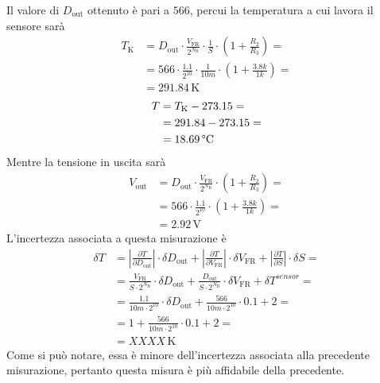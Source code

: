 \documentclass[a4paper]{article}
\newcommand\abs[1]{\left|#1\right|}
\begin{document}
			Il valore di $ D_{\mathrm{out}} $ ottenuto è pari a $ 566 $, percui la temperatura a cui lavora il sensore sarà
			\begin{equation*}
				\begin{split}
					T_{\mathrm{K}} &= D_{\mathrm{out}} \cdot \frac{V_{\mathrm{FR}}}{2^{N_{\mathrm{B}}}} \cdot \frac{1}{S} \cdot (1 + \frac{R_{2}}{R_{3}}) = \\
								   &= 566 \cdot \frac{1.1}{2^{10}} \cdot \frac{1}{10m} \cdot (1 + \frac{3.8k}{1k}) = \\
								   &= 291.84 \, \mathrm{K}
				\end{split}
			\end{equation*}
			\begin{equation*}
				\begin{split}
					T &= T_{\mathrm{K}} - 273.15 = \\
					  &= 291.84 - 273.15 = \\
					  &= 18.69 \, \mathrm{\text{\textdegree} C}
				\end{split}
			\end{equation*}
			Mentre la tensione in uscita sarà
			\begin{equation*}
				\begin{split}
					V_{\mathrm{out}} &= D_{\mathrm{out}} \cdot \frac{V_{\mathrm{FR}}}{2^{N_{\mathrm{B}}}} \cdot (1 + \frac{R_{2}}{R_{3}}) = \\
									 &= 566 \cdot \frac{1.1}{2^{10}} \cdot (1 + \frac{3.8k}{1k}) = \\
									 &= 2.92 \, \mathrm{V}
				\end{split}
			\end{equation*}
			L'incertezza associata a questa misurazione è
			\begin{equation*}
				\begin{split}
					\delta T &= \abs{\frac{\partial T}{\partial D_{\mathrm{out}}}} \cdot \delta D_{\mathrm{out}} + \abs{\frac{\partial T}{\partial V_{\mathrm{FR}}}} \cdot \delta V_{\mathrm{FR}} + \abs{\frac{\partial T}{\partial S}} \cdot \delta S = \\
							 &= \frac{V_{\mathrm{FR}}}{S \cdot 2^{N_{\mathrm{B}}}} \cdot \delta D_{\mathrm{out}} + \frac{D_{\mathrm{out}}}{S \cdot 2^{N_{\mathrm{B}}}} \cdot \delta V_{\mathrm{FR}} + \delta T^{sensor} = \\
							 &= \frac{1.1}{10m \cdot 2^{10}} \cdot \delta D_{\mathrm{out}} + \frac{566}{10m \cdot 2^{10}} \cdot 0.1 + 2 = \\
							 &= 1 + \frac{566}{10m \cdot 2^{10}} \cdot 0.1 + 2 = \\
							 &= XXXX \, \mathrm{K}
				\end{split}
			\end{equation*}
			Come si può notare, essa è minore dell'incertezza associata alla precedente misurazione, pertanto questa misura è più affidabile della precedente.
\end{document}
